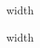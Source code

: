 \fi


\begin{minipage}{\linewidth}

\vrule height.5pt depth 0pt width\linewidth
\newline
\fontsize{8}{8.7}\selectfont
\begin{wrapfigure}[14]{l}[0pt]{25mm}
\end{wrapfigure}
\authorfive

\end{minipage}

\fi


\begin{minipage}{\linewidth}

\vrule height.5pt depth 0pt width\linewidth
\newline
\fontsize{8}{8.7}\selectfont
\begin{wrapfigure}[14]{l}[0pt]{25mm}
\end{wrapfigure}
\authorsix

\end{minipage}

\fi


